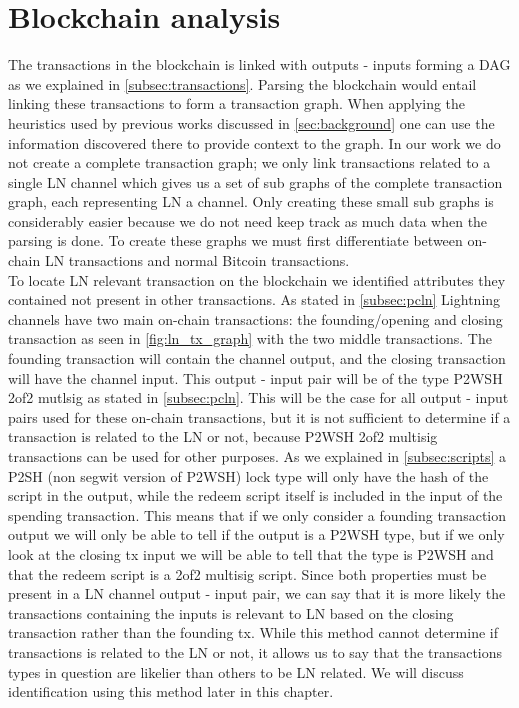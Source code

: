 \section{Blockchain analysis}

The transactions in the blockchain is linked with outputs - inputs forming a DAG as we explained in \cref{subsec:transactions}. Parsing the blockchain would entail linking these transactions to form a transaction graph. When applying the heuristics used by previous works discussed in \cref{sec:background} one can use the information discovered there to provide context to the graph. In our work we do not create a complete transaction graph; we only link transactions related to a single LN channel which gives us a set of sub graphs of the complete transaction graph, each representing LN a channel. Only creating these small sub graphs is considerably easier because we do not need keep track as much data when the parsing is done. To create these graphs we must first differentiate between on-chain LN transactions and normal Bitcoin transactions.
\\

To locate LN relevant transaction on the blockchain we identified attributes they contained not present in other transactions. As stated in \cref{subsec:pcln} Lightning channels have two main on-chain transactions: the founding/opening and closing transaction as seen in \cref{fig:ln_tx_graph} with the two middle transactions. The founding transaction will contain the channel output, and the closing transaction will have the channel input. This output - input pair will be of the type P2WSH 2of2 mutlsig as stated in \cref{subsec:pcln}. This will be the case for all output - input pairs used for these on-chain transactions, but it is not sufficient to determine if a transaction is related to the LN or not, because P2WSH 2of2 multisig transactions can be used for other purposes. As we explained in \cref{subsec:scripts} a P2SH (non segwit version of P2WSH) lock type will only have the hash of the script in the output, while the redeem script itself is included in the input of the spending transaction. This means that if we only consider a founding transaction output we will only be able to tell if the output is a P2WSH type, but if we only look at the closing tx input we will be able to tell that the type is P2WSH and that the redeem script is a 2of2 multisig script. Since both properties must be present in a LN channel output - input pair, we can say that it is more likely the transactions containing the inputs is relevant to LN based on the closing transaction rather than the founding tx. While this method cannot determine if transactions is related to the LN or not, it allows us to say that the transactions types in question are likelier than others to be LN related. We will discuss identification using this method later in this chapter.
\\

